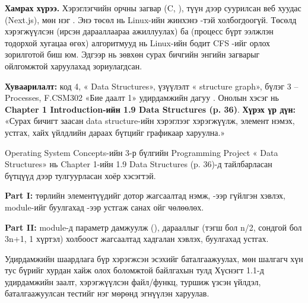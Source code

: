 \textbf{Хамрах хүрээ.} Хэрэглэгчийн орчны загвар (C, ), түүн дээр суурилсан веб хуудас (Next.js), мөн нэг . Энэ төсөл нь Linux-ийн жинхэнэ -тэй холбогдоогүй. Төсөлд хэрэгжүүлсэн  (ирсэн дарааллаараа ажиллуулах) ба  (процесс бүрт ээлжлэн тодорхой хугацаа өгөх) алгоритмууд нь Linux-ийн бодит CFS -ийг орлох зорилготой биш юм. Эдгээр нь зөвхөн сурах бичгийн энгийн загварыг ойлгомжтой харуулахад зориулагдсан.


\textbf{Хуваарилалт:} код 4, « Data Structures», үзүүлэлт « structure graph», бүлэг 3 -- Processes, F.CSM302 «Бие даалт 1» удирдамжийн дагуу . Онолын хэсэг нь \textbf{Chapter 1 Introduction-ийн 1.9  Data Structures (p. 36)}. \textbf{Хүрэх үр дүн:} «Сурах бичигт заасан  data structure-ийн хэрэглээг хэрэгжүүлж, элемент нэмэх, устгах, хайх үйлдлийн дараах бүтцийг графикаар харуулна.»

Operating System Concepts-ийн 3-р бүлгийн Programming Project « Data Structures» нь Chapter 1-ийн 1.9  Data Structures (p. 36)-д тайлбарласан бүтцүүд дээр тулгуурласан хоёр хэсэгтэй.

\textbf{Part I:}  төрлийн элементүүдийг  дотор жагсаалтад нэмж, -ээр гүйлгэн хэвлэх, module-ийг буулгахад -ээр устгаж санах ойг чөлөөлөх.

\textbf{Part II:} module-д  параметр дамжуулж (),  дарааллыг (тэгш бол n/2, сондгой бол 3n+1, 1 хүртэл) холбоост жагсаалтад хадгалан хэвлэх, буулгахад устгах.

Удирдамжийн шаардлага бүр хэрэгжсэн эсэхийг баталгаажуулах, мөн шалгагч хүн тус бүрийг хурдан хайж олох боломжтой байлгахын тулд Хүснэгт 1.1-д удирдамжийн заалт, хэрэгжүүлсэн файл/функц, туршиж үзсэн үйлдэл, баталгаажуулсан тестийг нэг мөрөнд эгнүүлэн харуулав.


